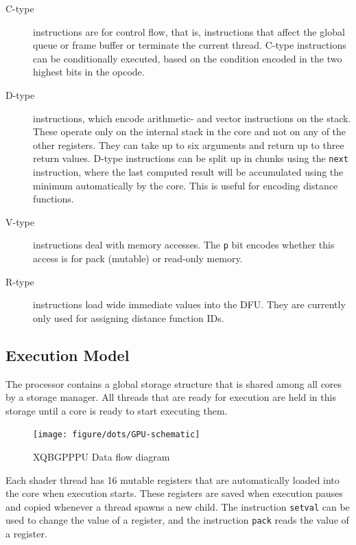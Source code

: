 			\begin{description}
				\item[C-type] instructions are for control flow, that is, 
					instructions that affect the global queue or frame buffer or
					terminate the current thread. C-type instructions can be 
					conditionally executed, based on the condition encoded in
					the two highest bits in the opcode. 

				\item[D-type] instructions, which encode arithmetic- and vector
					instructions on the stack. These operate only on the
					internal stack in the core and not on any of the other
					registers. They can take up to six arguments and return up
					to three return values. D-type instructions can be split up
					in chunks using the \texttt{next} instruction, where the
					last computed result will be accumulated using the minimum
					automatically by the core. This is useful for encoding
					distance functions.

				\item[V-type] instructions deal with memory accesses. The
					\texttt{p} bit encodes whether this access is for pack
					(mutable) or read-only memory.

				\item[R-type] instructions load wide immediate values into the
					DFU. They are currently only used for assigning distance
					function IDs.
			\end{description}

		\subsection{Execution Model}

			The processor contains a global storage structure that is shared
			among all cores by a storage manager. All threads that are 
			ready for execution are held in this storage until a core is ready 
			to start executing them.

			\begin{figure}[H]
				\centering
				\caption{ XQBGPPPU Data flow diagram }
				\texttt{[image: figure/dots/GPU-schematic]} 
				\vspace{-4pt}
			\end{figure}
	
			Each shader thread has 16 mutable registers that are automatically
			loaded into the core when execution starts. These registers are
			saved when execution pauses and copied whenever a thread spawns a 
			new child. The instruction \texttt{setval} can be used to change 
			the value of a register, and the instruction \texttt{pack} reads 
			the value of a register.

